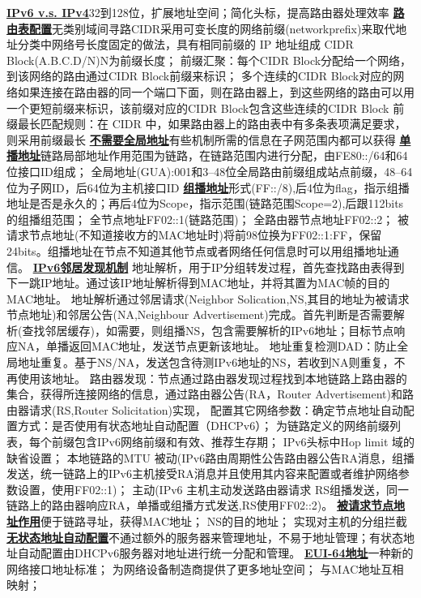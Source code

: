 \documentclass[twocolumn]{ctexart}
\renewcommand{\emph}[1]{\textbf{\underline{#1}}}
\begin{document}
\emph{IPv6 v.s. IPv4}32到128位，扩展地址空间；简化头标，提高路由器处理效率
\emph{路由表配置}无类别域间寻路CIDR采用可变长度的网络前缀(networkprefix)来取代地址分类中网络号长度固定的做法，具有相同前缀的 IP 地址组成 CIDR Block(A.B.C.D/N)N为前缀长度；
前缀汇聚：每个CIDR Block分配给一个网络，到该网络的路由通过CIDR Block前缀来标识；
多个连续的CIDR Block对应的网络如果连接在路由器的同一个端口下面，则在路由器上，到这些网络的路由可以用一个更短前缀来标识，该前缀对应的CIDR Block包含这些连续的CIDR Block
前缀最长匹配规则：在 CIDR 中，如果路由器上的路由表中有多条表项满足要求，则采用前缀最长
\emph{不需要全局地址}有些机制所需的信息在子网范围内都可以获得
\emph{单播地址}链路局部地址作用范围为链路，在链路范围内进行分配，由FE80::/64和64位接口ID组成；
全局地址(GUA):001和3--48位全局路由前缀组成站点前缀，48--64位为子网ID，后64位为主机接口ID
\emph{组播地址}形式(FF::/8),后4位为flag，指示组播地址是否是永久的；再后4位为Scope，指示范围(链路范围Scope=2),后跟112bits的组播组范围；
全节点地址FF02::1(链路范围)；
全路由器节点地址FF02::2；
被请求节点地址(不知道接收方的MAC地址时)将前98位换为FF02::1:FF，保留24bits。组播地址在节点不知道其他节点或者网络任何信息时可以用组播地址通信。
\emph{IPv6邻居发现机制}
地址解析，用于IP分组转发过程，首先查找路由表得到下一跳IP地址。通过该IP地址解析得到MAC地址，并将其置为MAC帧的目的MAC地址。
地址解析通过邻居请求(Neighbor Solication,NS,其目的地址为被请求节点地址)和邻居公告(NA,Neighbour Advertisement)完成。首先判断是否需要解析(查找邻居缓存)，如需要，则组播NS，包含需要解析的IPv6地址；目标节点响应NA，单播返回MAC地址，发送节点更新该地址。
地址重复检测DAD：防止全局地址重复。基于NS/NA，发送包含待测IPv6地址的NS，若收到NA则重复，不再使用该地址。
路由器发现：节点通过路由器发现过程找到本地链路上路由器的集合，获得所连接网络的信息，通过路由器公告(RA，Router Advertisement)和路由器请求(RS,Router Solicitation)实现，
配置其它网络参数：确定节点地址自动配置方式：是否使用有状态地址自动配置（DHCPv6）；
为链路定义的网络前缀列表，每个前缀包含IPv6网络前缀和有效、推荐生存期；
IPv6头标中Hop limit 域的缺省设置；
本地链路的MTU
被动(IPv6路由周期性公告路由器公告RA消息，组播发送，统一链路上的IPv6主机接受RA消息并且使用其内容来配置或者维护网络参数设置，使用FF02::1)；
主动(IPv6 主机主动发送路由器请求 RS组播发送，同一链路上的路由器响应RA，单播或组播方式发送,RS使用FF02::2)。
\emph{被请求节点地址作用}便于链路寻址，获得MAC地址；
NS的目的地址；
实现对主机的分组拦截
\emph{无状态地址自动配置}不通过额外的服务器来管理地址，不易于地址管理；有状态地址自动配置由DHCPv6服务器对地址进行统一分配和管理。
\emph{EUI-64地址}一种新的网络接口地址标准；
为网络设备制造商提供了更多地址空间；
与MAC地址互相映射；
\end{document}
